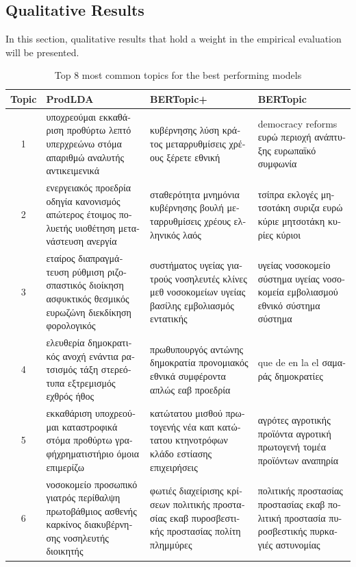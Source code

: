 \subsection{Qualitative Results}
\label{sec:experimentalResults} 
In this section, qualitative results that hold a weight in the empirical evaluation will be presented.
\begin{table}[H]
\caption{Top 8 most common topics for the best performing models}
\label{tab:best_model_topics}
\centering
{\footnotesize 
\begin{tabular}{|c|m{4.5cm}|m{4.5cm}|m{4.5cm}|}
\hline
\textbf{Topic} & \textbf{ProdLDA} & \textbf{BERTopic+} & \textbf{BERTopic} \\
\hline
1 & \textgreek{υποχρεούμαι εκκαθάριση προθύρτω λεπτό υπερχρεώνω στόμα απαριθμώ αναλυτής αντικειμενικά} & \textgreek{κυβέρνησης λύση κράτος μεταρρυθμίσεις χρέους ξέρετε εθνική} & democracy reforms \textgreek{ευρώ περιοχή ανάπτυξης ευρωπαϊκό συμφωνία} \\
\hline
2 & \textgreek{ενεργειακός προεδρία οδηγία κανονισμός απώτερος έτοιμος πολυετής υιοθέτηση μετανάστευση ανεργία} & \textgreek{σταθερότητα μνημόνια κυβέρνησης βουλή μεταρρυθμίσεις χρέους ελληνικός λαός} & \textgreek{τσίπρα εκλογές μητσοτάκη συριζα ευρώ κύριε μητσοτάκη κυρίες κύριοι} \\
\hline
3 & \textgreek{εταίρος διαπραγμάτευση ρύθμιση ριζοσπαστικός διοίκηση ασφυκτικός θεσμικός ευρωζώνη διεκδίκηση φορολογικός} & \textgreek{συστήματος υγείας γιατρούς νοσηλευτές κλίνες μεθ νοσοκομείων υγείας βασίλης εμβολιασμός εντατικής} & \textgreek{υγείας νοσοκομείο σύστημα υγείας νοσοκομεία εμβολιασμού εθνικό σύστημα σύστημα} \\
\hline
4 & \textgreek{ελευθερία δημοκρατικός ανοχή ενάντια ρατσισμός τάξη στερεότυπα εξτρεμισμός εχθρός ήθος} & \textgreek{πρωθυπουργός αντώνης δημοκρατία προνομιακός εθνικά συμφέροντα απλώς εαβ προεδρία} & que de en la el \textgreek{σαμαράς δημοκρατίες} \\
\hline
5 & \textgreek{εκκαθάριση υποχρεούμαι καταστροφικά στόμα προθύρτω γραφήχρηματιστήριο όμοια επιμερίζω} & \textgreek{κατώτατου μισθού πρωτογενής νέα καπ κατώτατου κτηνοτρόφων κλάδο εστίασης επιχειρήσεις} & \textgreek{αγρότες αγροτικής προϊόντα αγροτική πρωτογενή τομέα προϊόντων αναπηρία} \\
\hline
6 & \textgreek{νοσοκομείο προσωπικό γιατρός περίθαλψη πρωτοβάθμιος ασθενής καρκίνος διακυβέρνησης νοσηλευτής διοικητής} & \textgreek{φωτιές διαχείρισης κρίσεων πολιτικής προστασίας εκαβ πυροσβεστικής προστασίας πολίτη πλημμύρες} & \textgreek{πολιτικής προστασίας προστασίας εκαβ πολιτική προστασία πυροσβεστικής πυρκαγιές αστυνομίας} \\

\end{tabular}}
\end{table}
